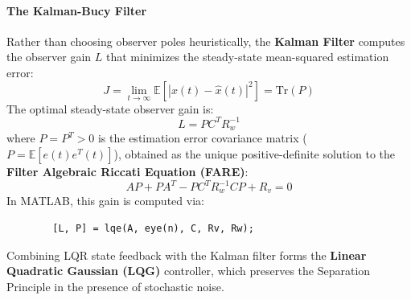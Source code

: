 \documentclass[12pt,onecolumn,twoside ]{article}
\begin{document}
	\paragraph{The Kalman-Bucy Filter}
	Rather than choosing observer poles heuristically, the \textbf{Kalman Filter} computes the observer gain $L$ that minimizes the steady-state mean-squared estimation error: \[
	J = \lim_{t \to \infty} \mathbb{E}\left[ |x(t) - \hat{x}(t)|^2 \right] = \text{Tr}(P)
	\]
	The optimal steady-state observer gain is: \[
	L = P C^T R_w^{-1}
	\] where $P = P^T > 0$ is the estimation error covariance matrix ($P = \mathbb{E}[e(t)e^T(t)]$), obtained as the unique positive-definite solution to the \textbf{Filter Algebraic Riccati Equation (FARE)}: \[
	AP + PA^T - PC^T R_w^{-1} C P + R_v = 0
	\]
	In MATLAB, this gain is computed via:
	\begin{lstlisting}
		[L, P] = lqe(A, eye(n), C, Rv, Rw);
	\end{lstlisting}
	Combining LQR state feedback with the Kalman filter forms the \textbf{Linear Quadratic Gaussian (LQG)} controller, which preserves the Separation Principle in the presence of stochastic noise.
	
\end{document}
